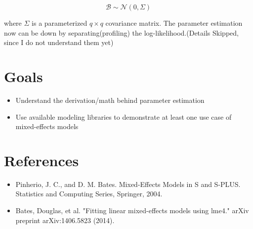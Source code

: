 \documentclass{ifacconf}
\begin{document}
$$
\mathcal{B} \sim \mathcal{N}(0,\Sigma)
$$

where $\Sigma$ is a parameterized $q\times q$ covariance matrix.
The parameter estimation now can be down by separating(profiling) the log-likelihood.(Details Skipped, since I do not understand them yet)




\section{Goals}

\begin{itemize}
	\item Understand the derivation/math behind parameter estimation
	\item Use available modeling libraries to demonstrate at least one use case  of mixed-effects models
\end{itemize}


\section{References}
\begin{itemize}
\item Pinherio, J. C., and D. M. Bates. Mixed-Effects Models in S and S-PLUS. Statistics and Computing Series, Springer, 2004.

\item Bates, Douglas, et al. "Fitting linear mixed-effects models using lme4." arXiv preprint arXiv:1406.5823 (2014).
	
\end{itemize}
\end{document}
